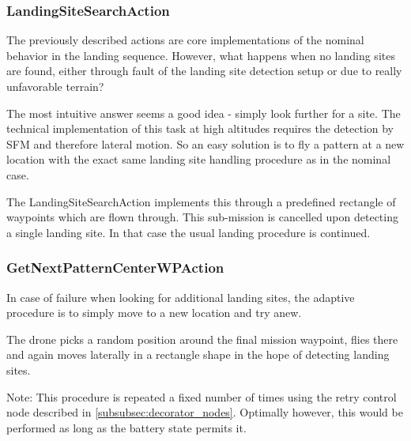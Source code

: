 \subsubsection{LandingSiteSearchAction}

The previously described actions are core implementations of the nominal behavior in the landing sequence. However, what happens when no landing sites are found, either through fault of the landing site detection setup or due to really unfavorable terrain?

The most intuitive answer seems a good idea - simply look further for a site. The technical implementation of this task at high altitudes requires the detection by SFM and therefore lateral motion. So an easy solution is to fly a pattern at a new location with the exact same landing site handling procedure as in the nominal case.

The LandingSiteSearchAction implements this through a predefined rectangle of waypoints which are flown through. This sub-mission is cancelled upon detecting a single landing site. In that case the usual landing procedure is continued.

\subsubsection{GetNextPatternCenterWPAction}

In case of failure when looking for additional landing sites, the adaptive procedure is to simply move to a new location and try anew. 

The drone picks a random position around the final mission waypoint, flies there and again moves laterally in a rectangle shape in the hope of detecting landing sites.

Note: This procedure is repeated a fixed number of times using the retry control node described in \cref{subsubsec:decorator_nodes}. Optimally however, this would be performed as long as the battery state permits it. 

